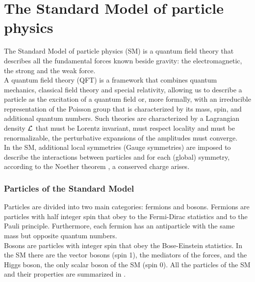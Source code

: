 \label{sec:TH}
\minitoc
\section{The Standard Model of particle physics}

The Standard Model of particle physics (SM) is a quantum field theory that describes all the fundamental forces known beside gravity: the electromagnetic, the strong and the weak force. \\
A quantum field theory (QFT) is a framework that combines quantum mechanics, classical field theory and special relativity, allowing us to describe a particle as the excitation of a quantum field or, more formally, with an irreducible representation of the Poisson group that is characterized by its mass, spin, and additional quantum numbers.
Such theories are characterized by a Lagrangian density $\mathcal{L}_\text{}$ that must be Lorentz invariant, must respect locality and must be renormalizable, \ie the perturbative expansions of the amplitudes must converge. \\
In the SM, additional local symmetries (Gauge symmetries) are imposed to describe the interactions between particles and for each (global) symmetry, according to the Noether theorem \cite{NoetherInvarianteVariationsprobleme}, a conserved charge arises.

\subsubsection*{Particles of the Standard Model}
Particles are divided into two main categories: fermions and bosons. 
Fermions are particles with half integer spin that obey to the Fermi-Dirac statistics and to the Pauli principle. 
Furthermore, each fermion has an antiparticle with the same mass but opposite quantum numbers.\\
Bosons are particles with integer spin that obey the Bose-Einstein statistics. In the SM there are the vector bosons (spin 1), the mediators of the forces, and the Higgs boson, the only scalar boson of the SM (spin 0). All the particles of the SM and their properties are summarized in .



